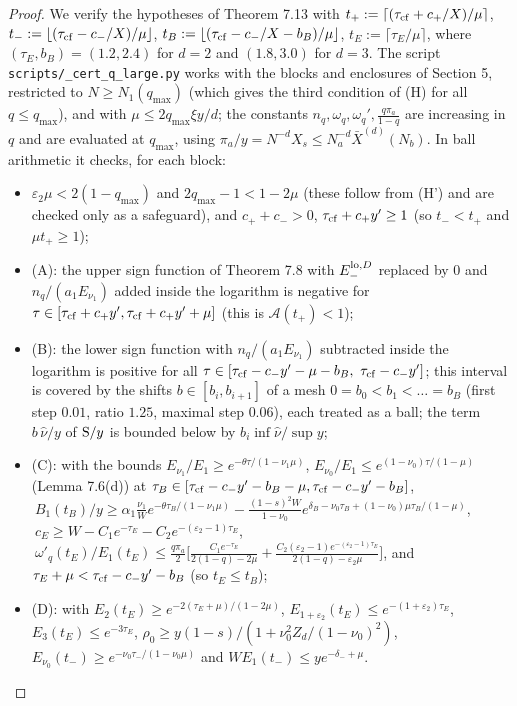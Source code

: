 \documentclass[11pt,a4paper]{article}
\theoremstyle{definition}
\theoremstyle{remark}
\begin{document}
\begin{proof}
We verify the hypotheses of Theorem 7.13 with $t_+:=\lceil(\tau_{\rm cf}+c_+/X)/\mu\rceil$, $t_-:=\lfloor(\tau_{\rm cf}-c_-/X)/\mu\rfloor$, $t_B:=\lfloor(\tau_{\rm cf}-c_-/X-b_B)/\mu\rfloor$, $t_E:=\lceil\tau_E/\mu\rceil$, where $(\tau_E,b_B)=(1.2,2.4)$ for $d=2$ and $(1.8,3.0)$ for $d=3$. The script \texttt{scripts/\_\allowbreak cert\_\allowbreak q\_\allowbreak large.py} works with the blocks and enclosures of Section 5, restricted to $N\ge N_1(q_{\max})$ (which gives the third condition of (H) for all $q\le q_{\max}$), and with $\mu\le2q_{\max}\xi y/d$; the constants $n_q,\omega_q,\omega_q',\frac{q\pi_a}{1-q}$ are increasing in $q$ and are evaluated at $q_{\max}$, using $\pi_a/y=N^{-d}X_s\le N_a^{-d}\bar X^{(d)}(N_b)$. In ball arithmetic it checks, for each block:

\begin{itemize}
\item $\varepsilon_2\mu<2(1-q_{\max})$ and $2q_{\max}-1<1-2\mu$ (these follow from (H') and are checked only as a safeguard), and $c_++c_->0$, $\tau_{\rm cf}+c_+y'\ge1$ (so $t_-<t_+$ and $\mu t_+\ge1$);
\item (A): the upper sign function of Theorem 7.8 with $E_-^{{\rm lo},D}$ replaced by $0$ and $n_q/(a_1E_{\nu_1})$ added inside the logarithm is negative for $\tau\in[\tau_{\rm cf}+c_+y',\tau_{\rm cf}+c_+y'+\mu]$ (this is $\mathcal A(t_+)<1$);
\item (B): the lower sign function with $n_q/(a_1E_{\nu_1})$ subtracted inside the logarithm is positive for all $\tau\in[\tau_{\rm cf}-c_-y'-\mu-b_B,\ \tau_{\rm cf}-c_-y']$; this interval is covered by the shifts $b\in[b_i,b_{i+1}]$ of a mesh $0=b_0<b_1<\dots=b_B$ (first step $0.01$, ratio $1.25$, maximal step $0.06$), each treated as a ball; the term $b\,\hat\nu/y$ of ${\rm S}/y$ is bounded below by $b_i\inf\hat\nu/\sup y$;
\item (C): with the bounds $E_{\nu_1}/E_1\ge e^{-\theta\tau/(1-\nu_1\mu)}$, $E_{\nu_0}/E_1\le e^{(1-\nu_0)\tau/(1-\mu)}$ (Lemma 7.6(d)) at $\tau_B\in[\tau_{\rm cf}-c_-y'-b_B-\mu,\tau_{\rm cf}-c_-y'-b_B]$, $\ B_1(t_B)/y\ge\alpha_1\frac{\nu_1}{W}e^{-\theta\tau_B/(1-\nu_1\mu)}-\frac{(1-s)^2W}{1-\nu_0}e^{\delta_B-\nu_0\tau_B+(1-\nu_0)\mu\tau_B/(1-\mu)}$, $\ c_E\ge W-C_1e^{-\tau_E}-C_2e^{-(\varepsilon_2-1)\tau_E}$, $\ \omega'_q(t_E)/E_1(t_E)\le\frac{q\pi_a}{2}\bigl[\frac{C_1e^{-\tau_E}}{2(1-q)-2\mu}+\frac{C_2(\varepsilon_2-1)e^{-(\varepsilon_2-1)\tau_E}}{2(1-q)-\varepsilon_2\mu}\bigr]$, and $\tau_E+\mu<\tau_{\rm cf}-c_-y'-b_B$ (so $t_E\le t_B$);
\item (D): with $E_2(t_E)\ge e^{-2(\tau_E+\mu)/(1-2\mu)}$, $E_{1+\varepsilon_2}(t_E)\le e^{-(1+\varepsilon_2)\tau_E}$, $E_3(t_E)\le e^{-3\tau_E}$, $\rho_0\ge y(1-s)/(1+\nu_0^2Z_d/(1-\nu_0)^2)$, $E_{\nu_0}(t_-)\ge e^{-\nu_0\tau_-/(1-\nu_0\mu)}$ and $WE_1(t_-)\le ye^{-\delta_-+\mu}$.
\end{itemize}


\end{proof}
\end{document}
